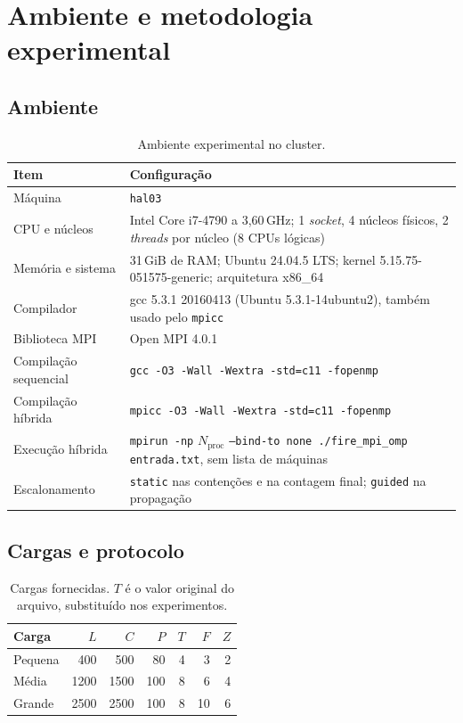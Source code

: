 \documentclass[11pt,a4paper]{article}
\begin{document}
\section{Ambiente e metodologia experimental}\label{sec:ambiente}

\subsection{Ambiente}

\begin{table}[H]
\centering
\caption{Ambiente experimental no cluster.}
\begin{tabularx}{\linewidth}{lX}
\toprule
\textbf{Item} & \textbf{Configuração} \\
\midrule
Máquina & \texttt{hal03} \\
CPU e núcleos & Intel Core i7-4790 a 3,60\,GHz; 1 \emph{socket}, 4 núcleos físicos, 2 \emph{threads} por núcleo (8 CPUs lógicas) \\
Memória e sistema & 31\,GiB de RAM; Ubuntu 24.04.5 LTS; kernel 5.15.75-051575-generic; arquitetura x86\_64 \\
Compilador & gcc 5.3.1 20160413 (Ubuntu 5.3.1-14ubuntu2), também usado pelo \texttt{mpicc} \\
Biblioteca MPI & Open MPI 4.0.1 \\
Compilação sequencial & \texttt{gcc -O3 -Wall -Wextra -std=c11 -fopenmp} \\
Compilação híbrida & \texttt{mpicc -O3 -Wall -Wextra -std=c11 -fopenmp} \\
Execução híbrida & \texttt{mpirun -np} $N_{\mathrm{proc}}$ \texttt{--bind-to none ./fire\_mpi\_omp entrada.txt}, sem lista de máquinas \\
Escalonamento & \texttt{static} nas contenções e na contagem final; \texttt{guided} na propagação \\
\bottomrule
\end{tabularx}
\end{table}

\subsection{Cargas e protocolo}

\begin{table}[H]
\centering
\caption{Cargas fornecidas. $T$ é o valor original do arquivo, substituído nos experimentos.}
\begin{tabular}{lrrrrrr}
\toprule
\textbf{Carga} & $L$ & $C$ & $P$ & $T$ & $F$ & $Z$ \\
\midrule
Pequena & 400 & 500 & 80 & 4 & 3 & 2 \\
Média & 1200 & 1500 & 100 & 8 & 6 & 4 \\
Grande & 2500 & 2500 & 100 & 8 & 10 & 6 \\
\bottomrule
\end{tabular}
\end{table}
\end{document}
